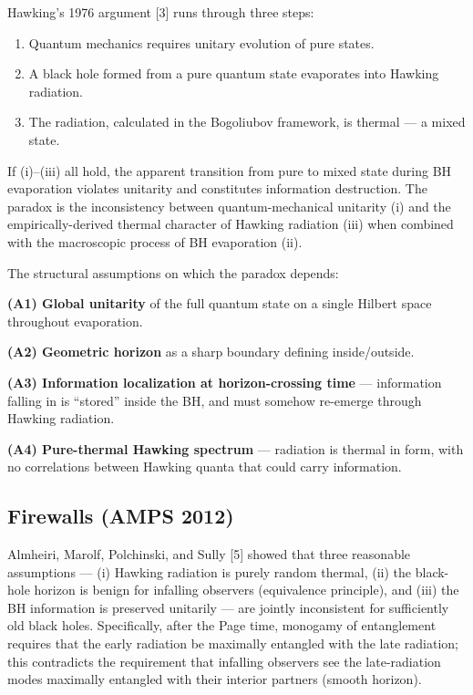 \documentclass[11pt,a4paper]{article}
\begin{document}
Hawking's 1976 argument [3] runs through three steps:

\begin{enumerate}[label=(\roman*),noitemsep]
  \item Quantum mechanics requires unitary evolution of pure states.
  \item A black hole formed from a pure quantum state evaporates into Hawking radiation.
  \item The radiation, calculated in the Bogoliubov framework, is thermal --- a mixed state.
\end{enumerate}

If (i)--(iii) all hold, the apparent transition from pure to mixed state during BH evaporation violates unitarity and constitutes information destruction. The paradox is the inconsistency between quantum-mechanical unitarity (i) and the empirically-derived thermal character of Hawking radiation (iii) when combined with the macroscopic process of BH evaporation (ii).

The structural assumptions on which the paradox depends:

\textbf{(A1) Global unitarity} of the full quantum state on a single Hilbert space throughout evaporation.

\textbf{(A2) Geometric horizon} as a sharp boundary defining inside/outside.

\textbf{(A3) Information localization at horizon-crossing time} --- information falling in is ``stored'' inside the BH, and must somehow re-emerge through Hawking radiation.

\textbf{(A4) Pure-thermal Hawking spectrum} --- radiation is thermal in form, with no correlations between Hawking quanta that could carry information.

\subsection{Firewalls (AMPS 2012)}

Almheiri, Marolf, Polchinski, and Sully [5] showed that three reasonable assumptions --- (i) Hawking radiation is purely random thermal, (ii) the black-hole horizon is benign for infalling observers (equivalence principle), and (iii) the BH information is preserved unitarily --- are jointly inconsistent for sufficiently old black holes. Specifically, after the Page time, monogamy of entanglement requires that the early radiation be maximally entangled with the late radiation; this contradicts the requirement that infalling observers see the late-radiation modes maximally entangled with their interior partners (smooth horizon).
\end{document}
